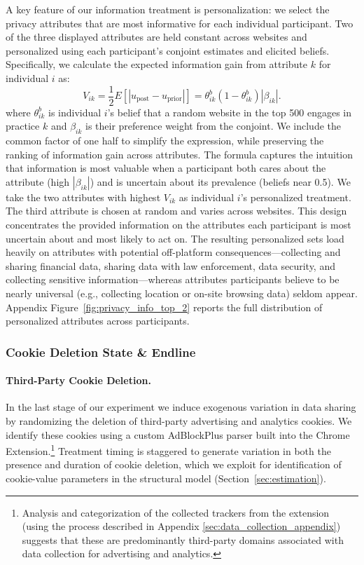 \documentclass[12pt]{article}
\theoremstyle{definition}
\theoremstyle{remark}
\begin{document}
A key feature of our information treatment is personalization: we select the privacy attributes that are most informative for each individual participant. Two of the three displayed attributes are held constant across websites and personalized using each participant's conjoint estimates and elicited beliefs. Specifically, we calculate the expected information gain from attribute $k$ for individual $i$ as:
\begin{equation}\label{eq:provided_info}
V_{ik}
=
\frac{1}{2}
E\left[
\left|u_{\text{post}}-u_{\text{prior}}\right|
\right]
=
\theta^b_{ik}(1-\theta^b_{ik})\left|\beta_{ik}\right|.
\end{equation}
where $\theta^b_{ik}$ is individual $i$'s belief that a random website in the top 500 engages in practice $k$ and $\beta_{ik}$ is their preference weight from the conjoint. We include the common factor of one half to simplify the expression, while preserving the ranking of information gain across attributes. The formula captures the intuition that information is most valuable when a participant both cares about the attribute (high $|\beta_{ik}|$) and is uncertain about its prevalence (beliefs near 0.5). We take the two attributes with highest $V_{ik}$ as individual $i$'s personalized treatment. The third attribute is chosen at random and varies across websites. This design concentrates the provided information on the attributes each participant is most uncertain about and most likely to act on. The resulting personalized sets load heavily on attributes with potential off-platform consequences---collecting and sharing financial data, sharing data with law enforcement, data security, and collecting sensitive information---whereas attributes participants believe to be nearly universal (e.g., collecting location or on-site browsing data) seldom appear. Appendix Figure~\ref{fig:privacy_info_top_2} reports the full distribution of personalized attributes across participants.

\subsubsection{Cookie Deletion State \& Endline}

\paragraph{Third-Party Cookie Deletion.} In the last stage of our experiment we induce exogenous variation in data sharing by randomizing the deletion of third-party advertising and analytics cookies. We identify these cookies using a custom AdBlockPlus parser built into the Chrome Extension.\footnote{Analysis and categorization of the collected trackers from the extension (using the process described in Appendix \ref{sec:data_collection_appendix}) suggests that these are predominantly third-party domains associated with data collection for advertising and analytics.} Treatment timing is staggered to generate variation in both the presence and duration of cookie deletion, which we exploit for identification of cookie-value parameters in the structural model (Section~\ref{sec:estimation}).
\end{document}
